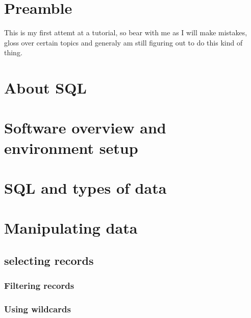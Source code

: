 \documentclass[12pt]{article} %
\begin{document}
\section{Preamble} %

This is my first attemt at a tutorial, so bear with me as I will make mistakes, gloss over certain topics and generaly am still figuring out to do this kind of thing.


\section{About SQL} %


\section{Software overview and environment setup} %


\section{SQL and types of data} %


\section{Manipulating data} %


\subsection{selecting records} %


\subsubsection{Filtering records} %


\subsubsection{Using wildcards} %
\end{document}
